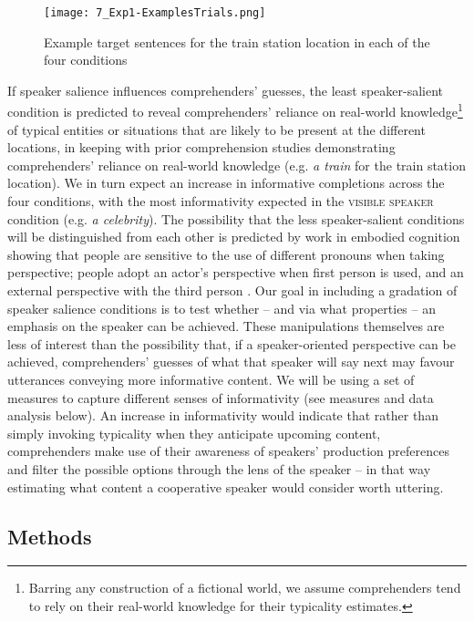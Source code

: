 \documentclass[output=paper,colorlinks,citecolor=brown]{langscibook}
\begin{document}
\begin{figure}
\texttt{[image: 7\_Exp1-ExamplesTrials.png]}
\caption{Example target sentences for the train station location in each of the four conditions}
\label{Figure1}
\end{figure}

\hspace*{-2.4pt}If speaker salience influences comprehenders’ guesses, the least speaker-salient condition is predicted to reveal comprehenders’ reliance on real-world knowledge\footnote{Barring any construction of a fictional world, we assume comprehenders tend to rely on their real-world knowledge for their typicality estimates.} of typical entities or situations that are likely to be present at the different locations, in keeping with prior comprehension studies demonstrating comprehenders' reliance on real-world knowledge (e.g. \textit{a train} for the train station location). We in turn expect an increase in informative completions across the four conditions, with the most informativity expected in the \textsc{visible speaker} condition (e.g. \textit{a celebrity}). The possibility that the less speaker-salient conditions will be distinguished from each other is predicted by work in embodied cognition showing that people are sensitive to the use of different pronouns when taking perspective; people adopt an actor's perspective when first person is used, and an external perspective with the third person \citep{BorghiCimatti2010}. Our goal in including a gradation of speaker salience conditions is to test whether -- and via what properties -- an emphasis on the speaker can be achieved. These manipulations themselves are less of interest than the possibility that, if a speaker-oriented perspective can be achieved, comprehenders' guesses of what that speaker will say next may favour utterances conveying more informative content. We will be using a set of measures to capture different senses of informativity (see measures and data analysis below). An increase in informativity would indicate that rather than simply invoking typicality when they anticipate upcoming content, comprehenders make use of their awareness of speakers’ production preferences and filter the possible options through the lens of the speaker -- in that way estimating what content a cooperative speaker would consider worth uttering.

\subsection{Methods}
\end{document}

